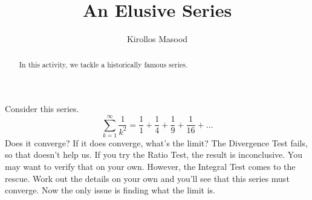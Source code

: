 \documentclass{ximera}
\title{An Elusive Series}
\author{Kirollos Masood}
\begin{document}
\begin{abstract}
In this activity, we tackle a historically famous series.
\end{abstract}
\maketitle

Consider this series.
\[
	\sum_{k=1}^{\infty} \frac{1}{k^2} = \frac{1}{1}+\frac{1}{4}+\frac{1}{9}+\frac{1}{16}+\ldots
\]
Does it converge? If it does converge, what's the limit? The Divergence Test fails, so that doesn't help us. If you try the Ratio Test, the result is inconclusive. You may want to verify that on your own. However, the Integral Test comes to the rescue. Work out the details on your own and you'll see that this series must converge. Now the only issue is finding what the limit is.
\end{document}
